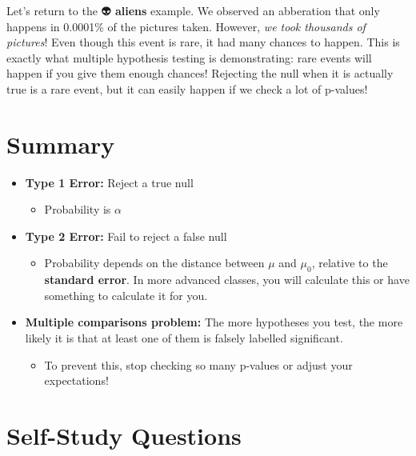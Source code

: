 \documentclass[
  letterpaper,
  DIV=11,
  numbers=noendperiod,
  oneside]{scrreprt}
\providecommand{\tightlist}{%
  \setlength{\itemsep}{0pt}\setlength{\parskip}{0pt}}\usepackage{longtable,booktabs,array}
\begin{document}
Let's return to the 👽 \textbf{aliens} example. We observed an
abberation that only happens in 0.0001\% of the pictures taken. However,
\emph{we took thousands of pictures}! Even though this event is rare, it
had many chances to happen. This is exactly what multiple hypothesis
testing is demonstrating: rare events will happen if you give them
enough chances! Rejecting the null when it is actually true is a rare
event, but it can easily happen if we check a lot of p-values!

\hypertarget{summary-6}{%
\section{Summary}\label{summary-6}}

\begin{itemize}
\tightlist
\item
  \textbf{Type 1 Error:} Reject a true null

  \begin{itemize}
  \tightlist
  \item
    Probability is \(\alpha\)
  \end{itemize}
\item
  \textbf{Type 2 Error:} Fail to reject a false null

  \begin{itemize}
  \tightlist
  \item
    Probability depends on the distance between \(\mu\) and \(\mu_0\),
    relative to the \textbf{standard error}. In more advanced classes,
    you will calculate this or have something to calculate it for you.
  \end{itemize}
\item
  \textbf{Multiple comparisons problem:} The more hypotheses you test,
  the more likely it is that at least one of them is falsely labelled
  significant.

  \begin{itemize}
  \tightlist
  \item
    To prevent this, stop checking so many p-values or adjust your
    expectations!
  \end{itemize}
\end{itemize}

\hypertarget{self-study-questions-4}{%
\section{Self-Study Questions}\label{self-study-questions-4}}
\end{document}
